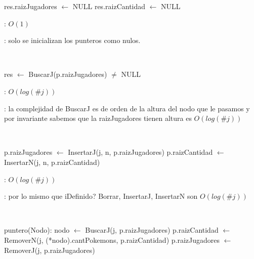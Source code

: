 \begin{Algoritmos}

	\begin{algorithm}[H]
		\NoCaptionOfAlgo
		\caption{}
		res.raizJugadores $\leftarrow$ NULL
		res.raizCantidad $\leftarrow$ NULL
	\end{algorithm}

	\complejidad: $O(1)$

	\justifcomp: solo se inicializan los punteros como nulos.

	~

	\begin{algorithm}[H]
		\NoCaptionOfAlgo
		\caption{}
		res $\leftarrow$ BuscarJ(p.raizJugadores) $\neq$ NULL
	\end{algorithm}

	\complejidad: $O(log(\#j))$

	\justifcomp: la complejidad de BuscarJ es de orden de la altura del nodo que le pasamos y por invariante sabemos que la raizJugadores tienen altura es $O(log(\#j))$

	~

	\begin{algorithm}[H]
		\NoCaptionOfAlgo
		\caption{}
		p.raizJugadores $\leftarrow$ InsertarJ(j, n, p.raizJugadores)
		p.raizCantidad $\leftarrow$ InsertarN(j, n, p.raizCantidad)
	\end{algorithm}

	\complejidad: $O(log(\#j))$

	\justifcomp: por lo mismo que iDefinido? Borrar, InsertarJ, InsertarN son $O(log(\#j))$

	~

	\begin{algorithm}[H]
		\NoCaptionOfAlgo
		\caption{}
		puntero(Nodo): nodo $\leftarrow$ BuscarJ(j, p.raizJugadores)
		p.raizCantidad $\leftarrow$ RemoverN(j, (*nodo).cantPokemons, p.raizCantidad)
		p.raizJugadores $\leftarrow$ RemoverJ(j, p.raizJugadores)
	\end{algorithm}


\end{Algoritmos}
